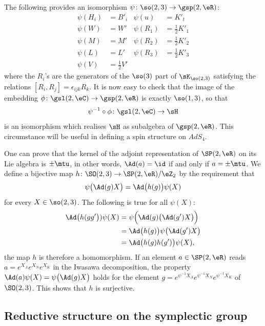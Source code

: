 The following provides an isomorphism $\psi\colon \so(2,3)\to \gsp(2,\eR)$:
\begin{align*}
	\psi(H_i) & =B'_i            & \psi(u)   & =K'_t              \\
	\psi(W)   & =W'              & \psi(R_1) & =\frac{ 1 }{2}K'_1 \\
	\psi(M)   & =M'              & \psi(R_2) & =\frac{ 1 }{2}K'_2 \\
	\psi(L)   & =L'              & \psi(R_3) & =\frac{ 1 }{2}K'_3 \\
	\psi(V)   & =\frac{ 1 }{2}V'
\end{align*}
where the $R_i$'s are the generators of the $\so(3)$ part of $\sK_{\so(2,3)}$ satisfying the relations $[R_i,R_j]=\epsilon_{ijk}R_k$. It is now easy to check that the image of the embedding $\phi\colon \gsl(2,\eC) \to \gsp(2,\eR)$ is exactly $\so(1,3)$, so that
\begin{equation}
	\psi^{-1}\circ\phi\colon \gsl(2,\eC)\to \sH
\end{equation}
is an isomorphism which realises $\sH$ as subalgebra of $\gsp(2,\eR)$. This circumstance will be useful in defining a spin structure on $AdS_4$.

One can prove that the kernel of the adjoint representation of $\SP(2,\eR)$ on its Lie algebra is $\pm\mtu$, in other words, $\Ad(a)=\id$ if and only if $a=\pm\mtu$. We define a bijective map $h\colon \SO(2,3)\to \SP(2,\eR)/\eZ_2$ by the requirement that
\begin{equation}		\label{Eqdefhspsl}
	\psi\big( \Ad(g)X \big)=\Ad\big( h(g) \big)\psi(X)
\end{equation}
for every $X\in\so(2,3)$. The following is true for all $\psi(X)$:
\[
	\begin{split}
		\Ad\big(h(gg'\big)) \psi(X) & =\psi\Big( \Ad(g)\big( \Ad(g')X \big) \Big)  \\
		                            & =\Ad\big( h(g) \big)\psi\big( \Ad(g')X \big) \\
		                            & =\Ad\big( h(g)h(g') \big)\psi(X),
	\end{split}
\]
the map $h$ is therefore a homomorphism. If an element $a\in \SP(2,\eR)$ reads $a= e^{X_A} e^{X_N} e^{X_K}$ in the Iwasawa decomposition, the property $\Ad(a)\psi(X)=\psi\big( \Ad(g)X \big)$ holds for the element\label{PgSolhpsiSP} $g= e^{\psi^{-1}X_A} e^{\psi^{-1}X_N} e^{\psi^{-1}X_K}$ of $\SO(2,3)$. This shows that $h$ is surjective.

\subsection{Reductive structure on the symplectic group}		\label{SubSecRedspT}

